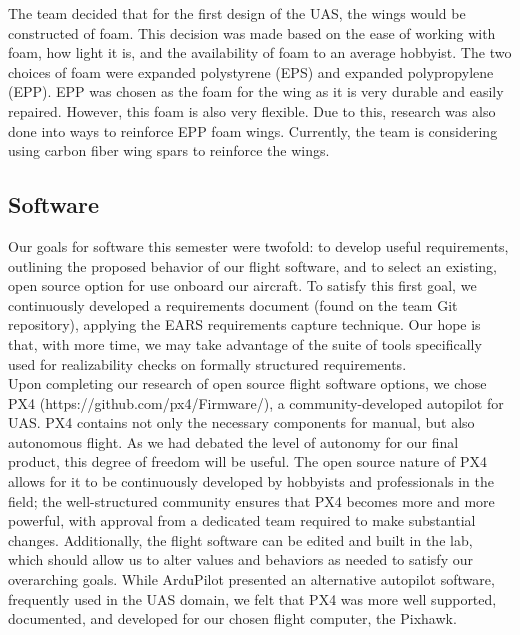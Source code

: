 \documentclass{article}
\begin{document}
\noindent The team decided that for the first design of the UAS, the wings would be constructed of foam. This decision was made based on the ease of working with foam, how light it is, and the availability of foam to an average hobbyist. The two choices of foam were expanded polystyrene (EPS) and expanded polypropylene (EPP). EPP was chosen as the foam for the wing as it is very durable and easily repaired. However, this foam is also very flexible. Due to this, research was also done into ways to reinforce EPP foam wings. Currently, the team is considering using carbon fiber wing spars to reinforce the wings. \\

\subsection{Software}
\noindent Our goals for software this semester were twofold: to develop useful requirements, outlining the proposed behavior of our flight software, and to select an existing, open source option for use onboard our aircraft. To satisfy this first goal, we continuously developed a requirements document (found on the team Git repository), applying the EARS requirements capture technique. Our hope is that, with more time, we may take advantage of the suite of tools specifically used for realizability checks on formally structured requirements.\\

\noindent Upon completing our research of open source flight software options, we chose PX4 (https://github.com/px4/Firmware/), a community-developed autopilot for UAS. PX4 contains not only the necessary components for manual, but also autonomous flight. As we had debated the level of autonomy for our final product, this degree of freedom will be useful. The open source nature of PX4 allows for it to be continuously developed by hobbyists and professionals in the field; the well-structured community ensures that PX4 becomes more and more powerful, with approval from a dedicated team required to make substantial changes. Additionally, the flight software can be edited and built in the lab, which should allow us to alter values and behaviors as needed to satisfy our overarching goals. While ArduPilot presented an alternative autopilot software, frequently used in the UAS domain, we felt that PX4 was more well supported, documented, and developed for our chosen flight computer, the Pixhawk. \\
\end{document}
